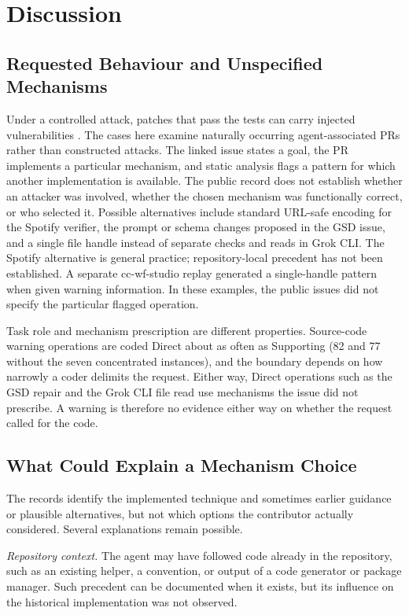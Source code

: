 \documentclass[acmsmall,screen,nonacm]{acmart}
\begin{document}
\section{Discussion}

\subsection{Requested Behaviour and Unspecified Mechanisms}

Under a controlled attack, patches that pass the tests can carry injected vulnerabilities \cite{b3}. The cases here examine naturally occurring agent-associated PRs rather than constructed attacks. The linked issue states a goal, the PR implements a particular mechanism, and static analysis flags a pattern for which another implementation is available. The public record does not establish whether an attacker was involved, whether the chosen mechanism was functionally correct, or who selected it. Possible alternatives include standard URL-safe encoding for the Spotify verifier, the prompt or schema changes proposed in the GSD issue, and a single file handle instead of separate checks and reads in Grok CLI. The Spotify alternative is general practice; repository-local precedent has not been established. A separate cc-wf-studio replay generated a single-handle pattern when given warning information. In these examples, the public issues did not specify the particular flagged operation.

Task role and mechanism prescription are different properties. Source-code warning operations are coded Direct about as often as Supporting (82 and 77 without the seven concentrated instances), and the boundary depends on how narrowly a coder delimits the request. Either way, Direct operations such as the GSD repair and the Grok CLI file read use mechanisms the issue did not prescribe. A warning is therefore no evidence either way on whether the request called for the code.

\subsection{What Could Explain a Mechanism Choice}\label{sec:explain}

The records identify the implemented technique and sometimes earlier guidance or plausible alternatives, but not which options the contributor actually considered. Several explanations remain possible.

\emph{Repository context.} The agent may have followed code already in the repository, such as an existing helper, a convention, or output of a code generator or package manager. Such precedent can be documented when it exists, but its influence on the historical implementation was not observed.
\end{document}
